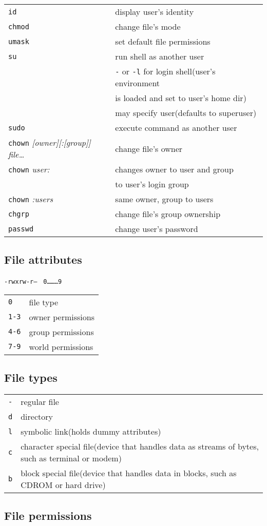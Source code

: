 \documentclass[8pt]{extarticle}
\begin{document}
\begin{multicols}{2}
\begin{tabular}{ll}
	\texttt{id} & display user's identity\\
	\texttt{chmod} & change file's mode\\
	\texttt{umask} & set default file permissions\\
	\texttt{su} & run shell as another user\\
	& \texttt{-} or \texttt{-l} for login shell(user's environment\\
	& is loaded and set to user's home dir)\\
	& may specify user(defaults to superuser)\\
	\texttt{sudo} & execute command as another user\\
	\texttt{chown} \textit{[owner][:[group]] file\ldots} & change file's owner\\
	\texttt{chown} \textit{user:} & changes owner to user and group \\
	& to user's login group\\
	\texttt{chown} \textit{:users} & same owner, group to users\\
	\texttt{chgrp} & change file's group ownership\\
	\texttt{passwd} & change user's password
\end{tabular}

\subsection{File attributes}

\texttt{-rwxrw-r-- }
\texttt{0\ldots\ldots\ldots9}
\begin{tabular}{ll}
	\texttt{0} & file type\\
	\texttt{1-3} & owner permissions\\
	\texttt{4-6} & group permissions\\
	\texttt{7-9} & world permissions
\end{tabular}

\subsection{File types}

\begin{tabular}{ll}
	\texttt{-} & regular file\\
	\texttt{d} & directory\\
	\texttt{l} & symbolic link(holds dummy attributes)\\
	\texttt{c} & character special file(device that handles data as streams of bytes, such as terminal or modem)\\
	\texttt{b} & block special file(device that handles data in blocks, such as CDROM or hard drive)
\end{tabular}

\subsection{File permissions}

\end{multicols}
\end{document}
